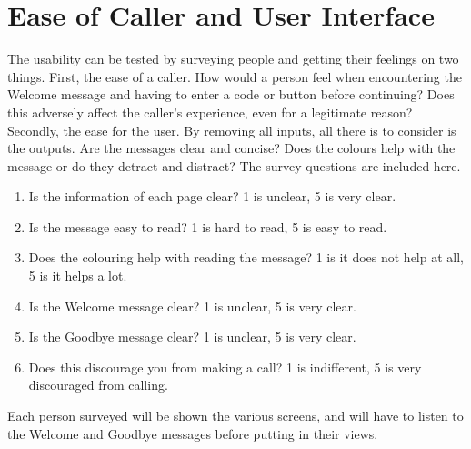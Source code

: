 \documentclass[main.tex]{subfiles}
\begin{document}
\section{Ease of Caller and User Interface}
The usability can be tested by surveying people and getting their feelings on two things. First, the ease of a caller. How would a person feel when encountering the Welcome message and having to enter a code or button before continuing? Does this adversely affect the caller's experience, even for a legitimate reason? Secondly, the ease for the user. By removing all inputs, all there is to consider is the outputs. Are the messages clear and concise? Does the colours help with the message or do they detract and distract? The survey questions are included here.

\begin{enumerate}
	\item Is the information of each page clear? 1 is unclear, 5 is very clear.
	\item Is the message easy to read? 1 is hard to read, 5 is easy to read.
	\item Does the colouring help with reading the message? 1 is it does not help at all, 5 is it helps a lot.
	\item Is the Welcome message clear? 1 is unclear, 5 is very clear.
	\item Is the Goodbye message clear? 1 is unclear, 5 is very clear.
	\item Does this discourage you from making a call? 1 is indifferent, 5 is very discouraged from calling.
\end{enumerate}

Each person surveyed will be shown the various screens, and will have to listen to the Welcome and Goodbye messages before putting in their views.
\end{document}
